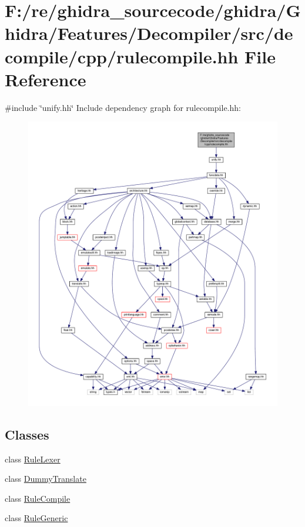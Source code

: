 \hypertarget{rulecompile_8hh}{}\section{F\+:/re/ghidra\+\_\+sourcecode/ghidra/\+Ghidra/\+Features/\+Decompiler/src/decompile/cpp/rulecompile.hh File Reference}
\label{rulecompile_8hh}
{\ttfamily \#include \char`\"{}unify.\+hh\char`\"{}}\newline
Include dependency graph for rulecompile.\+hh\+:
\nopagebreak
\begin{figure}[H]
\begin{center}
\leavevmode
\includegraphics[width=350pt]{rulecompile_8hh__incl}
\end{center}
\end{figure}
\subsection*{Classes}
\begin{DoxyCompactItemize}
\item 
class \mbox{\hyperlink{class_rule_lexer}{Rule\+Lexer}}
\item 
class \mbox{\hyperlink{class_dummy_translate}{Dummy\+Translate}}
\item 
class \mbox{\hyperlink{class_rule_compile}{Rule\+Compile}}
\item 
class \mbox{\hyperlink{class_rule_generic}{Rule\+Generic}}
\end{DoxyCompactItemize}
